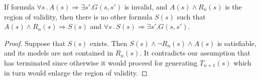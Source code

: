 \begin{lemma}
If formula $\forall s \,.\,  A(s) \Rightarrow \exists s' . G(s,s')$ is invalid, and $A(s) \land R_n(s)$ is the region of validity, then there is no other formula $S(s)$ such that $A(s) \land R_n(s) \Rightarrow S(s)$ and $\forall s \,.\,  S(s) \Rightarrow \exists s' . G(s,s')$.
\label{lem:subset}
\end{lemma}

\begin{proof}
Suppose that $S(s)$ exists.
Then $S(s) \land \neg{R_n(s)} \land A(s)$ is satisfiable, and its models are not contained in $R_n(s)$.
It contradicts our assumption that \aeval has terminated since otherwise it would proceed for generating $T_{n+1}(s)$ which in turn would enlarge the region of validity.
\end{proof}
